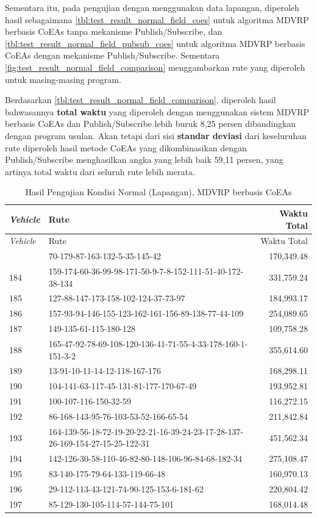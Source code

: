 Sementara itu, pada pengujian dengan menggunakan data lapangan, diperoleh hasil sebagaimana \autoref{tbl:test_result_normal_field_coes} untuk algoritma MDVRP berbasis CoEAs tanpa mekanisme Publish/Subscribe, dan \autoref{tbl:test_result_normal_field_pubsub_coes} untuk algoritma MDVRP berbasis CoEAs dengan mekanisme Publish/Subscribe. Sementara \autoref{fig:test_result_normal_field_comparison} menggambarkan rute yang diperoleh untuk masing-masing program.


Berdasarkan \autoref{tbl:test_result_normal_field_comparison}, diperoleh hasil bahwasannya \textbf{total waktu} yang diperoleh dengan menggunakan sistem MDVRP berbasis CoEAs dan Publish/Subscribe lebih buruk 8,25 persen  dibandingkan dengan program usulan. Akan tetapi dari sisi \textbf{standar deviasi} dari keseluruhan rute diperoleh hasil metode CoEAs yang dikombinasikan dengan Publish/Subscribe menghasilkan angka yang lebih baik 59,11 persen, yang artinya total waktu dari seluruh rute lebih merata.


\begin{longtable}[!]{lp{8cm}r}
	\caption{Hasil Pengujian Kondisi Normal (Lapangan), MDVRP berbasis CoEAs}
	\label{tbl:test_result_normal_field_coes}\\
	\toprule
		\textit{Vehicle} & Rute & Waktu Total\\ 
	\midrule
	\endfirsthead
	\toprule
		\textit{Vehicle} & Rute & Waktu Total\\ 
	\midrule
	\endhead
	\bottomrule
	\endfoot
		183 & 70-179-87-163-132-5-35-145-42 & 170,349.48 \\
		184 & 159-174-60-36-99-98-171-50-9-7-8-152-111-51-40-172-38-134 & 331,759.24 \\
		185 & 127-88-147-173-158-102-124-37-73-97 & 184,993.17 \\
		186 & 157-93-94-146-155-123-162-161-156-89-138-77-44-109 & 254,089.65 \\
		187 & 149-135-61-115-180-128 & 109,758.28 \\
		188 & 165-47-92-78-69-108-120-136-41-71-55-4-33-178-160-1-151-3-2 & 355,614.60 \\
		189 & 13-91-10-11-14-12-118-167-176 & 168,298.11 \\
		190 & 104-141-63-117-45-131-81-177-170-67-49 & 193,952.81 \\
		191 & 100-107-116-150-32-59 & 116,272.15 \\
		192 & 86-168-143-95-76-103-53-52-166-65-54 & 211,842.84 \\
		193 & 164-139-56-18-72-19-20-22-21-16-39-24-23-17-28-137-26-169-154-27-15-25-122-31 & 451,562.34 \\
		194 & 142-126-30-58-110-46-82-80-148-106-96-84-68-182-34 & 275,108.47 \\
		195 & 83-140-175-79-64-133-119-66-48 & 160,970.13 \\
		196 & 29-112-113-43-121-74-90-125-153-6-181-62 & 220,804.42 \\
		197 & 85-129-130-105-114-57-144-75-101 & 168,014.48 \\
\end{longtable}


